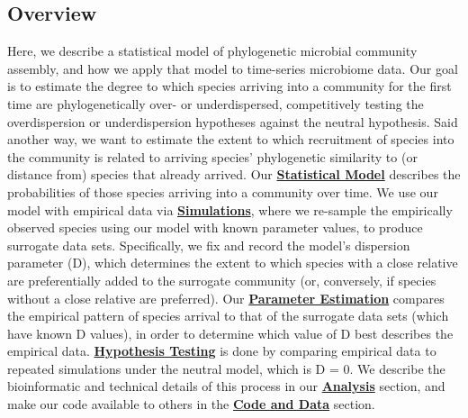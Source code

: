 \documentclass{article}
\begin{document}
\subsection{Overview} \label{sec:overview}
Here, we describe a statistical model of phylogenetic microbial community assembly, and how we apply that model to time-series microbiome data. Our goal is to estimate the degree to which species arriving into a community for the first time are phylogenetically over- or underdispersed, competitively testing the overdispersion or underdispersion hypotheses against the neutral hypothesis. Said another way, we want to estimate the extent to which recruitment of species into the community is related to arriving species’ phylogenetic similarity to (or distance from) species that already arrived. Our \hyperref[sec:statisticalModel]{\textbf{Statistical Model}} describes the probabilities of those species arriving into a community over time. We use our model with empirical data via \hyperref[sec:simulations]{\textbf{Simulations}}, where we re-sample the empirically observed species using our model with known parameter values, to produce surrogate data sets. Specifically, we fix and record the model’s dispersion parameter (D), which determines the extent to which species with a close relative are preferentially added to the surrogate community (or, conversely, if species without a close relative are preferred). Our \hyperref[sec:parameterEstimation]{\textbf{Parameter Estimation}} compares the empirical pattern of species arrival to that of the surrogate data sets (which have known D values), in order to determine which value of D best describes the empirical data. \hyperref[sec:hypothesisTesting]{\textbf{Hypothesis Testing}} is done by comparing empirical data to repeated simulations under the neutral model, which is D = 0. We describe the bioinformatic and technical details of this process in our \hyperref[sec:analysis]{\textbf{Analysis}} section, and make our code available to others in the \hyperref[sec:codeAndData]{\textbf{Code and Data}} section. 
\end{document}
